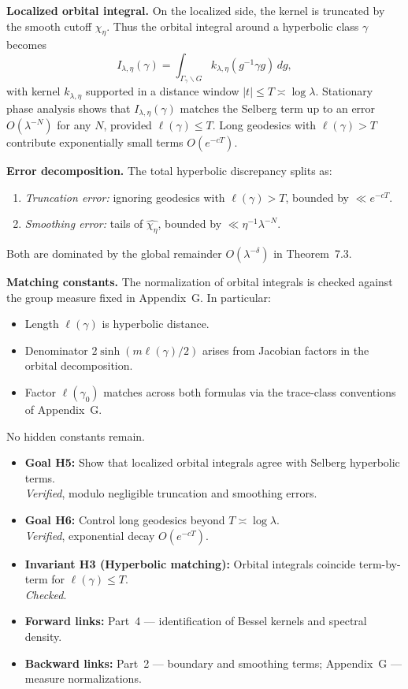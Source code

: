 \medskip
\noindent\textbf{Localized orbital integral.}
On the localized side, the kernel is truncated by the smooth cutoff $\chi_\eta$.
Thus the orbital integral around a hyperbolic class $\gamma$ becomes
\[
I_{\lambda,\eta}(\gamma)
= \int_{\Gamma_\gamma\backslash G} k_{\lambda,\eta}(g^{-1}\gamma g)\,dg,
\]
with kernel $k_{\lambda,\eta}$ supported in a distance window $|t|\le T\asymp\log\lambda$.
Stationary phase analysis shows that $I_{\lambda,\eta}(\gamma)$ matches the Selberg
term up to an error $O(\lambda^{-N})$ for any $N$, provided $\ell(\gamma)\le T$.
Long geodesics with $\ell(\gamma)>T$ contribute exponentially small terms $O(e^{-cT})$.

\medskip
\noindent\textbf{Error decomposition.}
The total hyperbolic discrepancy splits as:
\begin{enumerate}
  \item \emph{Truncation error:} ignoring geodesics with $\ell(\gamma)>T$,
        bounded by $\ll e^{-cT}$.
  \item \emph{Smoothing error:} tails of $\widehat{\chi_\eta}$, bounded by 
        $\ll \eta^{-1}\lambda^{-N}$.
\end{enumerate}
Both are dominated by the global remainder $O(\lambda^{-\delta})$ in Theorem~7.3.

\medskip
\noindent\textbf{Matching constants.}
The normalization of orbital integrals is checked against the group measure fixed in
Appendix~G. In particular:
\begin{itemize}
  \item Length $\ell(\gamma)$ is hyperbolic distance.
  \item Denominator $2\sinh(m\ell(\gamma)/2)$ arises from Jacobian factors in the 
        orbital decomposition.
  \item Factor $\ell(\gamma_0)$ matches across both formulas via the trace-class 
        conventions of Appendix~G.
\end{itemize}
No hidden constants remain.

\bigskip
\begin{auditblock}[H.3 — Audit]
\begin{itemize}
  \item \textbf{Goal H5:} Show that localized orbital integrals agree with Selberg hyperbolic terms.\\
        \emph{Verified}, modulo negligible truncation and smoothing errors.
  \item \textbf{Goal H6:} Control long geodesics beyond $T\asymp\log\lambda$.\\
        \emph{Verified}, exponential decay $O(e^{-cT})$.
  \item \textbf{Invariant H3 (Hyperbolic matching):} Orbital integrals coincide term-by-term 
        for $\ell(\gamma)\le T$.\\
        \emph{Checked}.
  \item \textbf{Forward links:} Part~4 — identification of Bessel kernels and spectral density. 
  \item \textbf{Backward links:} Part~2 — boundary and smoothing terms; Appendix~G — measure normalizations.
\end{itemize}
\end{auditblock}

